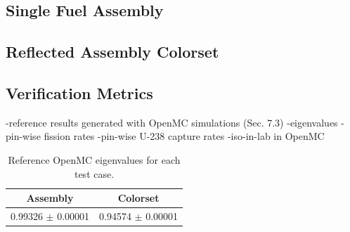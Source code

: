 \subsection{Single Fuel Assembly}
\label{subsubsec:benchmarks-assm}

\subsection{Reflected Assembly Colorset}
\label{subsubsec:benchmarks-2x2}



\subsection{Verification Metrics}
\label{subsec:metrics}

-reference results generated with OpenMC simulations (Sec. 7.3)
-eigenvalues
-pin-wise fission rates
-pin-wise U-238 capture rates
-iso-in-lab in OpenMC

\begin{table}[h!]
  \centering
  \caption{Reference OpenMC eigenvalues for each test case.}
  \label{tab:keff-reference} 
  \begin{tabular}{c c}
  \toprule
  {\bf Assembly} &
  {\bf Colorset} \\
  \midrule
  0.99326 $\pm$ 0.00001 & 0.94574 $\pm$ 0.00001 \\
  \bottomrule
\end{tabular}
\end{table}

